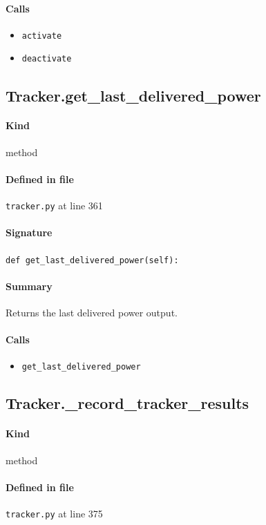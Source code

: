 \documentclass[11pt]{report}
\begin{document}
\paragraph{Calls}
\begin{itemize}[leftmargin=*]
  \item \texttt{activate}
  \item \texttt{deactivate}
\end{itemize}
\subsection{Tracker.get\_last\_delivered\_power}
\label{def:tracker.py:Tracker.get_last_delivered_power:L361}
\paragraph{Kind} method
\paragraph{Defined in file} \texttt{tracker.py} at line 361
\paragraph{Signature} \texttt{def get\_last\_delivered\_power(self):}
\paragraph{Summary} Returns the last delivered power output.
\paragraph{Calls}
\begin{itemize}[leftmargin=*]
  \item \texttt{get\_last\_delivered\_power}
\end{itemize}
\subsection{Tracker.\_record\_tracker\_results}
\label{def:tracker.py:Tracker._record_tracker_results:L375}
\paragraph{Kind} method
\paragraph{Defined in file} \texttt{tracker.py} at line 375
\end{document}
